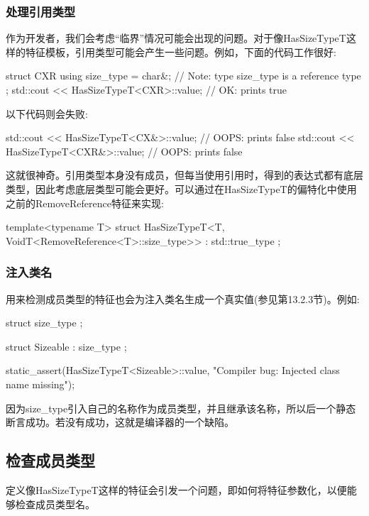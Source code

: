 \subsubsection{处理引用类型}

作为开发者，我们会考虑“临界”情况可能会出现的问题。对于像HasSizeTypeT这样的特征模板，引用类型可能会产生一些问题。例如，下面的代码工作很好:

\begin{cpp}
struct CXR {
	using size_type = char&; // Note: type size_type is a reference type
};
std::cout << HasSizeTypeT<CXR>::value; // OK: prints true
\end{cpp}

以下代码则会失败:

\begin{cpp}
std::cout << HasSizeTypeT<CX&>::value; // OOPS: prints false
std::cout << HasSizeTypeT<CXR&>::value; // OOPS: prints false
\end{cpp}

这就很神奇。引用类型本身没有成员，但每当使用引用时，得到的表达式都有底层类型，因此考虑底层类型可能会更好。可以通过在HasSizeTypeT的偏特化中使用之前的RemoveReference特征来实现:

\begin{cpp}
template<typename T>
struct HasSizeTypeT<T, VoidT<RemoveReference<T>::size_type>>
: std::true_type {
};
\end{cpp}

\subsubsection{注入类名}

用来检测成员类型的特征也会为注入类名生成一个真实值(参见第13.2.3节)。例如:

\begin{cpp}
struct size_type {
};

struct Sizeable : size_type {
};

static_assert(HasSizeTypeT<Sizeable>::value,
			"Compiler bug: Injected class name missing");
\end{cpp}

因为size\_type引入自己的名称作为成员类型，并且继承该名称，所以后一个静态断言成功。若没有成功，这就是编译器的一个缺陷。

\subsection{检查成员类型}

定义像HasSizeTypeT这样的特征会引发一个问题，即如何将特征参数化，以便能够检查成员类型名。


